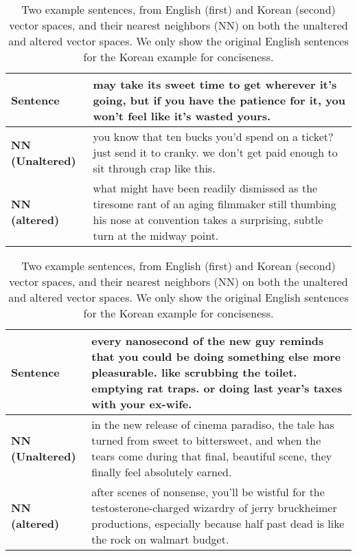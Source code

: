 \documentclass{article}
\begin{document}
\begin{table}[t]
	\scriptsize
  \centering
  \def\arraystretch{0.7}
    \begin{tabular}{|m{}|m{}|} \hline
    \textbf{Sentence} & may take its sweet time to get wherever it's going, but if you have the patience for it, you won't feel like it's wasted yours. \\\hline
    \textbf{NN \newline (Unaltered)} & you know that ten bucks you'd spend on a ticket? just send it to cranky. we don't get paid enough to sit through crap like this. \\\hline
    \textbf{NN \newline (altered)} & what might have been readily dismissed as the tiresome rant of an aging filmmaker still thumbing his nose at convention takes a surprising, subtle turn at the midway point. \\\hline
    \end{tabular}\vspace*{0.1cm}
    \begin{tabular}{|m{}|m{}|} \hline
    \textbf{Sentence} & every nanosecond of the new guy reminds 
that you could be doing something else 
more pleasurable. 
like scrubbing the toilet. 
emptying rat traps. or doing last year's taxes with your ex-wife. \\\hline
    \textbf{NN \newline (Unaltered)} & in the new release of cinema paradiso, the tale has turned from sweet to bittersweet, and when the tears come during that final, beautiful scene, they finally feel absolutely earned. \\\hline
    \textbf{NN \newline (altered)} & after 
scenes of 
nonsense, you'll be wistful for the testosterone-charged wizardry of jerry bruckheimer productions, especially because half past dead is like the rock on 
walmart budget. \\\hline
    \end{tabular}\caption{Two example sentences, from English (first) and Korean (second) vector spaces, and their nearest neighbors (NN) on both the unaltered and altered vector spaces. We only show the original English sentences for the Korean example for conciseness.}
  \label{tab:vecfixexample}\end{table}
\end{document}
